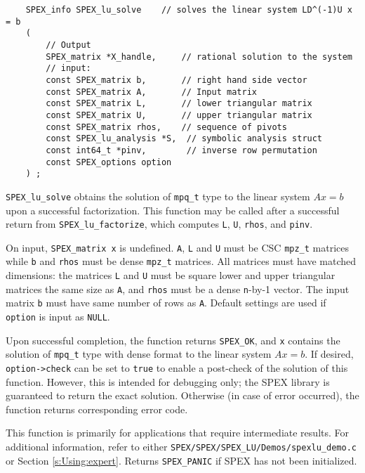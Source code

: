 \documentclass[12pt]{report}
\theoremstyle{definition}
\begin{document}
\begin{mdframed}[userdefinedwidth=6in]
{\footnotesize
\begin{verbatim}
    SPEX_info SPEX_lu_solve    // solves the linear system LD^(-1)U x = b
    (
        // Output
        SPEX_matrix *X_handle,     // rational solution to the system
        // input:
        const SPEX_matrix b,       // right hand side vector
        const SPEX_matrix A,       // Input matrix
        const SPEX_matrix L,       // lower triangular matrix
        const SPEX_matrix U,       // upper triangular matrix
        const SPEX_matrix rhos,    // sequence of pivots
        const SPEX_lu_analysis *S,  // symbolic analysis struct
        const int64_t *pinv,        // inverse row permutation
        const SPEX_options option
    ) ;
\end{verbatim}
} \end{mdframed}

\verb|SPEX_lu_solve| obtains the solution of \verb|mpq_t| type to the
linear system $Ax=b$ upon a successful factorization.  This function may be
called after a successful return from \verb|SPEX_lu_factorize|, which
computes \verb|L|, \verb|U|, \verb|rhos|, and \verb|pinv|.

On input, \verb|SPEX_matrix x| is undefined. \verb|A|, \verb|L| and \verb|U|
must be CSC \verb|mpz_t| matrices while \verb|b| and \verb|rhos| must be dense
\verb|mpz_t|  matrices. All matrices must have matched dimensions: the matrices
\verb|L| and \verb|U| must be square lower and upper triangular matrices the
same size as \verb|A|, and \verb|rhos| must be a dense \verb|n|-by-1 vector.
The input matrix \verb|b| must have same number of rows as \verb|A|.  Default
settings are used if \verb|option| is input as \verb|NULL|.

Upon successful completion, the function returns \verb|SPEX_OK|, and \verb|x|
contains the solution of \verb|mpq_t| type with dense format to the linear
system $Ax=b$. If desired, \verb|option->check| can be set to \verb|true| to
enable a post-check of the solution of this function.  However, this is
intended for debugging only; the SPEX library is guaranteed to return the
exact solution. Otherwise (in case of error occurred), the function returns
corresponding error code.

This function is primarily for applications that require intermediate results.
For additional information, refer to either \verb|SPEX/SPEX/SPEX_LU/Demos/spexlu_demo.c| or
Section \ref{s:Using:expert}.  Returns \verb|SPEX_PANIC| if SPEX has not
been initialized.
\end{document}
